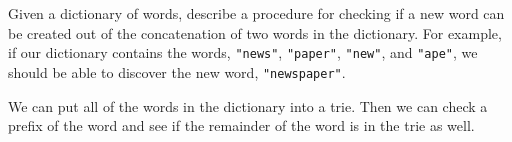 \begin{blocksection}
\question Given a dictionary of words, describe a procedure for checking if a
new word can be created out of the concatenation of two words in the
dictionary. For example, if our dictionary contains the words,
\lstinline$"news"$, \lstinline$"paper"$, \lstinline$"new"$, and
\lstinline$"ape"$, we should be able to discover the new word,
\lstinline$"newspaper"$.

\begin{solution}[1in]
We can put all of the words in the dictionary into a trie. Then we can check a
prefix of the word and see if the remainder of the word is in the trie as
well.
\end{solution}
\end{blocksection}
